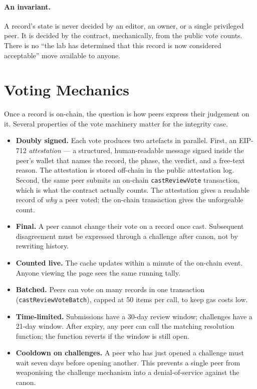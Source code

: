 \documentclass[11pt,a4paper]{article}
\begin{document}
\paragraph{An invariant.} A record's state is never decided by
an editor, an owner, or a single privileged peer. It is decided
by the contract, mechanically, from the public vote counts.
There is no ``the lab has determined that this record is now
considered acceptable'' move available to anyone.

\section{Voting Mechanics}

Once a record is on-chain, the question is how peers express
their judgement on it. Several properties of the vote machinery
matter for the integrity case.

\begin{itemize}[leftmargin=1.5em]
  \item \textbf{Doubly signed.} Each vote produces two artefacts
        in parallel. First, an EIP-712 \emph{attestation} --- a
        structured, human-readable message signed inside the
        peer's wallet that names the record, the phase, the
        verdict, and a free-text reason. The attestation is
        stored off-chain in the public attestation log. Second,
        the same peer submits an on-chain
        \texttt{castReviewVote} transaction, which is what the
        contract actually counts. The attestation gives a
        readable record of \emph{why} a peer voted; the on-chain
        transaction gives the unforgeable count.
  \item \textbf{Final.} A peer cannot change their vote on a
        record once cast. Subsequent disagreement must be
        expressed through a challenge after canon, not by
        rewriting history.
  \item \textbf{Counted live.} The cache updates within a
        minute of the on-chain event. Anyone viewing the page
        sees the same running tally.
  \item \textbf{Batched.} Peers can vote on many records in one
        transaction (\texttt{castReviewVoteBatch}), capped at
        50 items per call, to keep gas costs low.
  \item \textbf{Time-limited.} Submissions have a 30-day review
        window; challenges have a 21-day window. After expiry,
        any peer can call the matching resolution function; the
        function reverts if the window is still open.
  \item \textbf{Cooldown on challenges.} A peer who has just
        opened a challenge must wait seven days before opening
        another. This prevents a single peer from weaponising
        the challenge mechanism into a denial-of-service
        against the canon.
\end{itemize}
\end{document}
